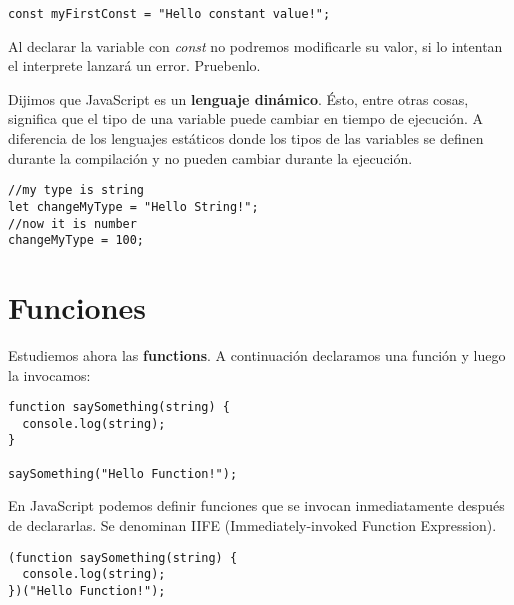 \documentclass[a4paper, oneside, titlepage, 12pt]{book}
\begin{document}
\begin{verbatim}
const myFirstConst = "Hello constant value!";
\end{verbatim}

Al declarar la variable con \textit{const} no podremos modificarle su valor, si lo intentan el interprete lanzará un error. Pruebenlo.  
\newline

Dijimos que JavaScript es un \textbf{lenguaje dinámico}. Ésto, entre otras cosas, significa que el tipo de una variable puede cambiar en tiempo de ejecución. A diferencia de los lenguajes estáticos donde los tipos de las variables se definen durante la compilación y no pueden cambiar durante la ejecución.

\begin{verbatim}
//my type is string
let changeMyType = "Hello String!";
//now it is number
changeMyType = 100;
\end{verbatim}

\section{Funciones} \label{functions}

Estudiemos ahora las \textbf{functions}. A continuación declaramos una función y luego la invocamos:

\begin{verbatim}
function saySomething(string) {
  console.log(string);
}

saySomething("Hello Function!");
\end{verbatim}

En JavaScript podemos definir funciones que se invocan inmediatamente después de declararlas. Se denominan IIFE (Immediately-invoked Function Expression).

\begin{verbatim}
(function saySomething(string) {
  console.log(string);
})("Hello Function!");
\end{verbatim}
\end{document}

